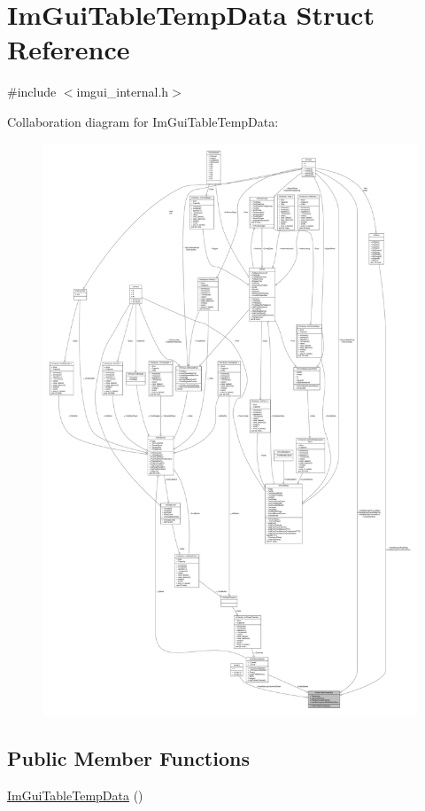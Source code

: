 \hypertarget{structImGuiTableTempData}{}\section{Im\+Gui\+Table\+Temp\+Data Struct Reference}
\label{structImGuiTableTempData}


{\ttfamily \#include $<$imgui\+\_\+internal.\+h$>$}



Collaboration diagram for Im\+Gui\+Table\+Temp\+Data\+:
\nopagebreak
\begin{figure}[H]
\begin{center}
\leavevmode
\includegraphics[width=350pt]{structImGuiTableTempData__coll__graph}
\end{center}
\end{figure}
\subsection*{Public Member Functions}
\begin{DoxyCompactItemize}
\item 
\hyperlink{structImGuiTableTempData_a89c6bdafaf73ccae9e3dc25b96dc7dab}{Im\+Gui\+Table\+Temp\+Data} ()
\end{DoxyCompactItemize}
